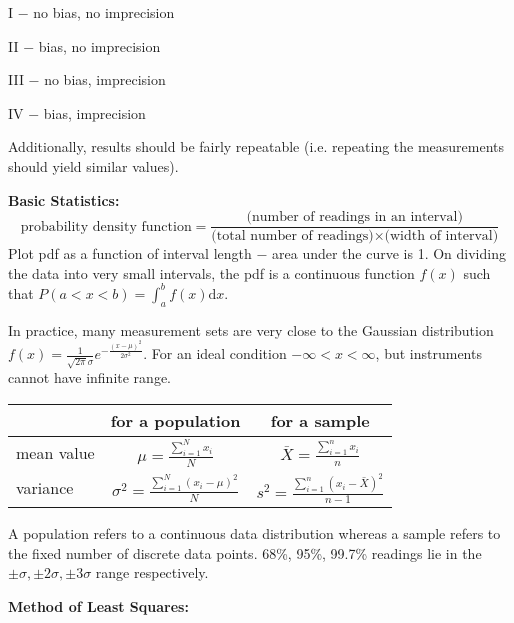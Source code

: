 \documentclass[11pt]{article}
\theoremstyle{definition}
\begin{document}
\hspace{0.37\textwidth}

I $-$ no bias, no imprecision

II $-$ bias, no imprecision

III $-$ no bias, imprecision

IV $-$ bias, imprecision

Additionally, results should be fairly repeatable (i.e. repeating the measurements should yield similar values).

\textbf{\large Basic Statistics:}
$$\text{probability density function}=\frac{\text{(number of readings in an interval)}}{\text{(total number of readings)}\times\text{(width of interval)}}$$
Plot pdf as a function of interval length $-$ area under the curve is 1. On dividing the data into very small intervals, the pdf is a continuous function $f(x)$ such that $\displaystyle P(a<x<b)=\int_a^b f(x)\text{d}x$. 

In practice, many measurement sets are very close to the Gaussian distribution $\displaystyle f(x)=\frac{1}{\sqrt{2\pi}\sigma}e^{-\frac{(x-\mu)^2}{2\sigma^2}}$. For an ideal condition $-\infty<x<\infty$, but instruments cannot have infinite range.

\begin{center}
\begin{tabular}{l|cc}
& for a population & for a sample\\
\hline
mean value & $\displaystyle \mu=\frac{\displaystyle\sum_{i=1}^Nx_i}{N}$ & $\displaystyle \bar{X}=\frac{\displaystyle\sum_{i=1}^nx_i}{n}$\\
variance & $\displaystyle\sigma^2=\frac{\displaystyle\sum_{i=1}^N(x_i-\mu)^2}{N}$ & $\displaystyle s^2=\frac{\displaystyle\sum_{i=1}^n(x_i-\bar{X})^2}{n-1}$\\
\end{tabular}
\end{center}
A population refers to a continuous data distribution whereas a sample refers to the fixed number of discrete data points. 68\%, 95\%, 99.7\% readings lie in the $\pm\sigma,\pm 2\sigma,\pm 3\sigma$ range respectively.
\vspace{2mm}

\textbf{\large Method of Least Squares:}
\end{document}

